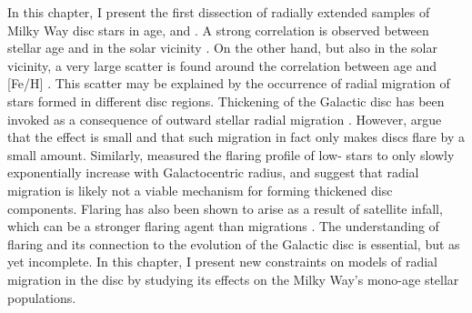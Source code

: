 
 In this chapter, I present the first dissection of radially extended samples of Milky Way disc stars in age, \feh{} and \afe{}. A strong correlation is observed between stellar age and \afe{} in the solar vicinity \citep{2013A&A...560A.109H}. On the other hand, but also in the solar vicinity, a very large scatter is found around the correlation between age and [Fe/H] \citep[e.g.][]{1993A&A...275..101E,2004A&A...418..989N}. This scatter may be explained by the occurrence of radial migration of stars formed in different disc regions. Thickening of the Galactic disc has been invoked as a consequence of outward stellar radial migration \citep[e.g.][]{2009MNRAS.399.1145S}. However, \citet{2012A&A...548A.127M} argue that the effect is small and that such migration in fact only makes discs flare by a small amount. Similarly, \citet{2016ApJ...823...30B} measured the flaring profile of low-\afe{} stars to only slowly exponentially increase with Galactocentric radius, and suggest that radial migration is likely not a viable mechanism for forming thickened disc components. Flaring has also been shown to arise as a result of satellite infall, which can be a stronger flaring agent than migrations \citep[e.g.][]{2009ApJ...707L...1B}. The understanding of flaring and its connection to the evolution of the Galactic disc is essential, but as yet incomplete. In this chapter, I present new constraints on models of radial migration in the disc by studying its effects on the Milky Way's mono-age stellar populations. 

